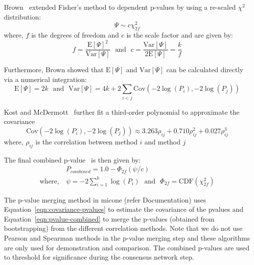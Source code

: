   Brown~\cite{brown_400_1975} extended Fisher's method to dependent p-values by using a re-scaled $\chi^2$ distribution:
  \begin{equation*}
    \Psi \sim c \chi^2_{2f}
  \end{equation*}
  where, $f$ is the degrees of freedom and $c$ is the scale factor and are given by:
  \begin{equation*}
    f = \frac{\mathrm{E}[\Psi]^2}{\mathrm{Var}[\Psi]} ~~~\text{and}~~~ c = \frac{\mathrm{Var}[\Psi]}{2\mathrm{E}[\Psi]} = \frac{k}{f}
  \end{equation*}

  Furthermore, Brown showed that $\mathrm{E}[\Psi]$ and $\mathrm{Var}[\Psi]$ can be calculated directly via a numerical integration:
  \begin{equation*}
    \mathrm{E}[\Psi] = 2k ~~~\text{and}~~~ \mathrm{Var}[\Psi] = 4k + 2\sum_{i<j} \mathrm{Cov}\left( -2\log(P_i), -2\log(P_j) \right)
  \end{equation*}

  Kost and McDermott~\cite{kost_combining_2002} further fit a third-order polynomial to approximate the covariance
  \begin{equation}
    \mathrm{Cov}\left( -2\log(P_i), -2\log(P_j) \right) \approx 3.263 \rho_{ij} + 0.710 \rho_{ij}^2 + 0.027 \rho_{ij}^3
    \label{eqn:covariance-pvalues}
  \end{equation}
  where, $\rho_{ij}$ is the correlation between method $i$ and method $j$

  The final combined p-value~\cite{Poole_Gibbs_Shmulevich_Bernard_Knijnenburg_2016} is then given by:
  \begin{equation}
    \begin{aligned}
        & P_{combined} = 1.0 - \Phi_{2f}\left( \psi / c \right) \\
        \text{where},~ &\psi = -2 \sum_{i=1}^k \log(P_i) ~~~\text{and}~~~ \Phi_{2f} = \mathrm{CDF}\left( \chi^2_{2f} \right)
    \end{aligned}
    \label{eqn:pvalue-combined}
  \end{equation}

  The p-value merging method in \ac{micone} (refer Documentation) uses Equation~\ref{eqn:covariance-pvalues} to estimate the covariance of the pvalues and Equation~\ref{eqn:pvalue-combined} to merge the p-values (obtained from bootstrapping) from the different correlation methods.
  Note that we do not use Pearson and Spearman methods in the p-value merging step and these algorithms are only used for demonstration and comparison.
  The combined p-values are used to threshold for significance during the consensus network step.

